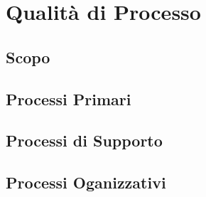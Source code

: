 \section{Qualità di Processo}

\subsection{Scopo}

\subsection{Processi Primari}

\subsection{Processi di Supporto}

\subsection{Processi Oganizzativi}
